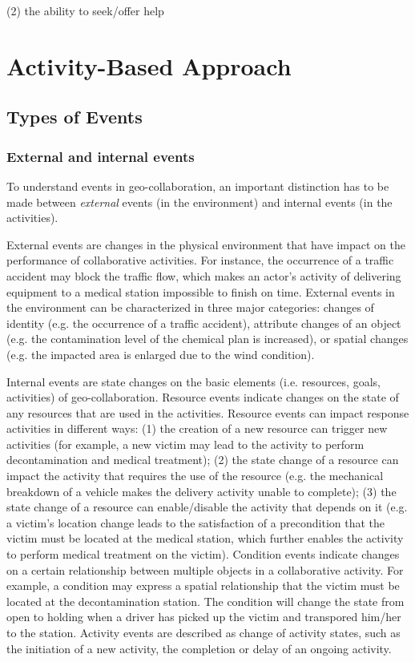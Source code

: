 (2) the ability to seek/offer help



\section{Activity-Based Approach} %
\label{sec:activity_based_approach}
\subsection{Types of Events} %
\label{sub:types_of_events}
\subsubsection{External and internal events} %
\label{ssub:external_and_internal_events}
To understand events in geo-collaboration, an important distinction has to be made between \emph{external} events (in the environment) and internal events (in the activities). 

External events are changes in the physical environment that have impact on the performance of collaborative activities. For instance, the occurrence of a traffic accident may block the traffic flow, which makes an actor’s activity of delivering equipment to a medical station impossible to finish on time. External events in the environment can be characterized in three major categories: changes of identity (e.g. the occurrence of a traffic accident), attribute changes of an object (e.g. the contamination level of the chemical plan is increased), or spatial changes (e.g. the impacted area is enlarged due to the wind condition).

Internal events are state changes on the basic elements (i.e. resources, goals, activities) of geo-collaboration. Resource events indicate changes on the state of any resources that are used in the activities. Resource events can impact response activities in different ways: (1) the creation of a new resource can trigger new activities (for example, a new victim may lead to the activity to perform decontamination and medical treatment); (2) the state change of a resource can impact the activity that requires the use of the resource (e.g. the mechanical breakdown of a vehicle makes the delivery activity unable to complete); (3) the state change of a resource can enable/disable the activity that depends on it (e.g. a victim’s location change leads to the satisfaction of a precondition that the victim must be located at the medical station, which further enables the activity to perform medical treatment on the victim). Condition events indicate changes on a certain relationship between multiple objects in a collaborative activity. For example, a condition may express a spatial relationship that the victim must be located at the decontamination station. The condition will change the state from open to holding when a driver has picked up the victim and transpored him/her to the station. Activity events are described as change of activity states, such as the initiation of a new activity, the completion or delay of an ongoing activity. 

